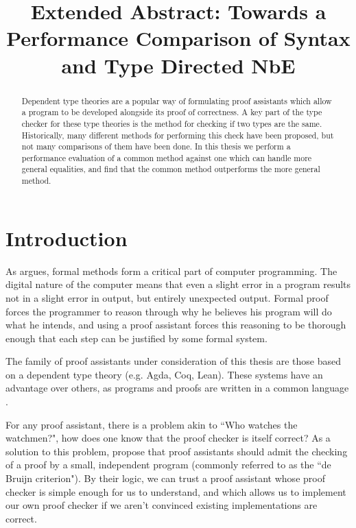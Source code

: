 \documentclass[sigplan,nonacm]{acmart}
\title{Extended Abstract: Towards a Performance Comparison of Syntax and Type Directed NbE}
\begin{document}
\begin{abstract}
Dependent type theories are a popular way of formulating proof assistants which allow a program to be developed alongside its proof of correctness.
A key part of the type checker for these type theories is the method for checking if two types are the same.
Historically, many different methods for performing this check have been proposed, but not many comparisons of them have been done.
In this thesis we perform a performance evaluation of a common method against one which can handle more general equalities, and find that the common method outperforms the more general method.
\end{abstract}

\maketitle

\section{Introduction}

As \citet{Dijkstra1988} argues, formal methods form a critical part of computer programming.
The digital nature of the computer means that even a slight error in a program results not in a slight error in output, but entirely unexpected output.
Formal proof forces the programmer to reason through why he believes his program will do what he intends, and using a proof assistant forces this reasoning to be thorough enough that each step can be justified by some formal system.

The family of proof assistants under consideration of this thesis are those based on a dependent type theory (e.g. Agda, Coq, Lean).
These systems have an advantage over others, as programs and proofs are written in a common language \citep{Nordstrom1990}.

For any proof assistant, there is a problem akin to ``Who watches the watchmen?", how does one know that the proof checker is itself correct?
As a solution to this problem, \citet{Barendregt2005} propose that proof assistants should admit the checking of a proof by a small, independent program (commonly referred to as the ``de Bruijn criterion").
By their logic, we can trust a proof assistant whose proof checker is simple enough for us to understand, and which allows us to implement our own proof checker if we aren't convinced existing implementations are correct.
\end{document}
